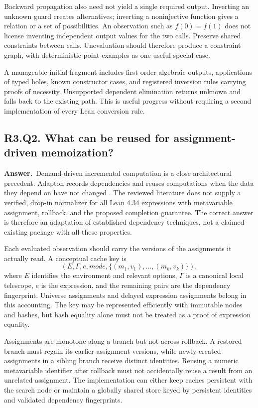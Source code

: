 \documentclass[11pt,a4paper]{article}
\theoremstyle{definition}
\theoremstyle{remark}
\newcommand{\answer}{\par\noindent\textbf{Answer.}\ }
\newcommand{\qheading}[2]{\subsection{#1. #2}}
\begin{document}
Backward propagation also need not yield a single required output. Inverting
an unknown guard creates alternatives; inverting a noninjective function gives
a relation or a set of possibilities. An observation such as $f(0)=f(1)$ does
not license inventing independent output values for the two calls. Preserve
shared constraints between calls. Unevaluation should therefore produce a
constraint graph, with deterministic point examples as one useful special case.

A manageable initial fragment includes first-order algebraic outputs,
applications of typed holes, known constructor cases, and registered inversion
rules carrying proofs of necessity. Unsupported dependent elimination returns
unknown and falls back to the existing path. This is useful progress without
requiring a second implementation of every Lean conversion rule.

\qheading{R3.Q2}{What can be reused for assignment-driven memoization?}
\answer Demand-driven incremental computation is a close architectural
precedent. Adapton records dependencies and reuses computations when the data
they depend on have not changed \cite{adapton}. The reviewed literature does
not supply a verified, drop-in normalizer for all Lean 4.34 expressions with
metavariable assignment, rollback, and the proposed completion guarantee.
The correct answer is therefore an adaptation of established dependency
techniques, not a claimed existing package with all these properties.

Each evaluated observation should carry the versions of the assignments it
actually read. A conceptual cache key is
\[
 (E,\Gamma,e,\mathit{mode},\{(m_1,v_1),\ldots,(m_k,v_k)\}),
 \tag{13}\label{eq:evalkey}
\]
where $E$ identifies the environment and relevant options, $\Gamma$ is a
canonical local telescope, $e$ is the expression, and the remaining pairs are
the dependency fingerprint. Universe assignments and delayed expression
assignments belong in this accounting. The key may be represented efficiently
with immutable nodes and hashes, but hash equality alone must not be treated
as a proof of expression equality.

Assignments are monotone along a branch but not across rollback. A restored
branch must regain its earlier assignment versions, while newly created
assignments in a sibling branch receive distinct identities. Reusing a numeric
metavariable identifier after rollback must not accidentally reuse a result
from an unrelated assignment. The implementation can either keep caches
persistent with the search node or maintain a globally shared store keyed by
persistent identities and validated dependency fingerprints.
\end{document}
